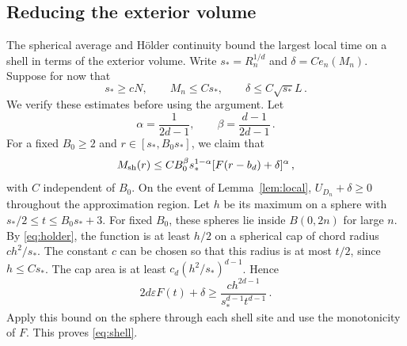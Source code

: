 \documentclass[11pt]{amsart}
\theoremstyle{plain}
\theoremstyle{definition}
\newcommand{\eps}{\varepsilon}
\begin{document}
\subsection{Reducing the exterior volume}
The spherical average and H\"older continuity bound the largest local
time on a shell in terms of the exterior volume.
Write $s_*=R_n^{1/d}$ and $\delta=Ce_n(M_n)$.
Suppose for now that
\begin{equation}\label{eq:preconditions}
s_*\geq cN ,\qquad M_n\leq Cs_* ,\qquad
\delta\leq C\sqrt{s_*}L\, .
\end{equation}
We verify these estimates before using the argument.
Let
\begin{equation}\label{eq:alpha-beta}
\alpha=\frac1{2d-1} ,\qquad \beta=\frac{d-1}{2d-1}\, .
\end{equation}
For a fixed $B_0\geq2$ and $r\in[s_*,B_0s_*]$, we claim that
\begin{equation}\label{eq:shell}
M_{\rm sh}(r)\leq CB_0^\beta s_*^{1-\alpha}
 [F(r-b_d)+\delta]^\alpha\, ,
\end{equation}
with $C$ independent of $B_0$.
On the event of Lemma~\ref{lem:local}, $U_{D_n}+\delta\geq0$
throughout the approximation region.
Let $h$ be its maximum on a sphere with
$s_*/2\leq t\leq B_0s_*+3$. For fixed $B_0$, these spheres lie
inside $B(0,2n)$ for large $n$.
By \eqref{eq:holder}, the function is at least $h/2$ on a spherical
cap of chord radius $ch^2/s_*$. The constant $c$ can be chosen so
that this radius is at most $t/2$, since $h\leq Cs_*$.
The cap area is at least $c_d(h^2/s_*)^{d-1}$. Hence
\begin{equation}\label{eq:cap-average}
2d\eps F(t)+\delta\geq
\frac{ch^{2d-1}}{s_*^{d-1}t^{d-1}}\, .
\end{equation}
Apply this bound on the sphere through each shell site and use the
monotonicity of $F$. This proves \eqref{eq:shell}.
\end{document}

